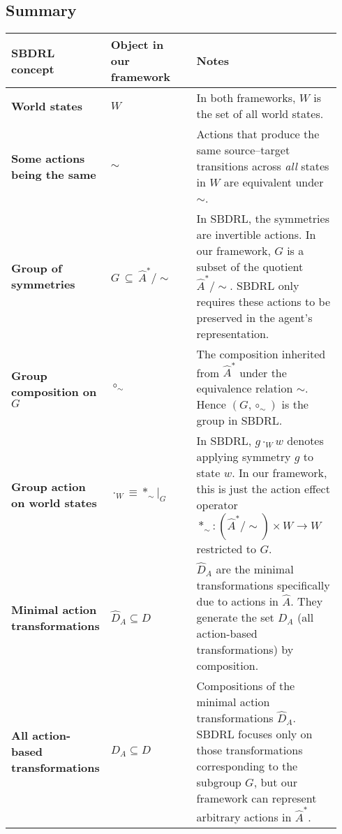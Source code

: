 \subsection{Summary}
\begin{table}[H]
\centering
\renewcommand{\arraystretch}{1.25}
\begin{tabular}{p{0.24\linewidth} p{0.26\linewidth} p{0.44\linewidth}}
\toprule
\textbf{SBDRL concept} & \textbf{Object in our framework} & \textbf{Notes} \\
\midrule
\textbf{World states} 
& \(W\) 
& In both frameworks, \(W\) is the set of all world states. \\

\textbf{Some actions being the same} & $\sim$ & Actions that produce the same source–target transitions across \emph{all} states in $W$ are equivalent under $\sim$. \\

\textbf{Group of symmetries} 
& \(G \,\subseteq\, \hat{A}^{\ast}/\sim\) 
& In SBDRL, the symmetries are invertible actions.  
In our framework, \(G\) is a subset of the quotient \(\hat{A}^{\ast}/\sim\).
SBDRL only requires these actions to be preserved in the agent's representation.
\\

\textbf{Group composition on \(G\)} 
& \(\circ_{\sim}\) 
& The composition inherited from \(\hat{A}^{\ast}\) under the equivalence relation \(\sim\).  
Hence \((G,\circ_{\sim})\) is the group in SBDRL.\\

\textbf{Group action on world states} 
& \(\cdot_{W} \equiv \ast_{\sim}\! \big\rvert_{G}\) 
& In SBDRL, \(g \cdot_{W} w\) denotes applying symmetry \(g\) to state \(w\).
In our framework, this is just the action effect operator $\ast_{\sim}: (\hat{A}^{*}/\sim) \times W \to W$ restricted to $G$.\\


\textbf{Minimal action transformations} 
& \(\hat{D}_{A}\subseteq D\) 
& \(\hat{D}_{A}\) are the minimal transformations specifically due to actions in \(\hat{A}\).  
They generate the set \(D_{A}\) (all action-based transformations) by composition.\\

\textbf{All action-based transformations} 
& \(D_{A}\subseteq D\) 
& Compositions of the minimal action transformations \(\hat{D}_{A}\).  
SBDRL focuses only on those transformations corresponding to the subgroup \(G\), but our framework can represent arbitrary actions in \(\hat{A}^{\ast}\).\\


\end{tabular}
\end{table}
